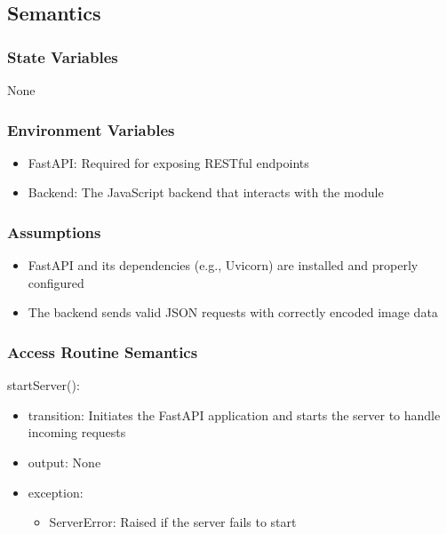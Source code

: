 \documentclass[12pt, titlepage]{article}
\begin{document}
\subsection{Semantics}

\subsubsection{State Variables}
None


\subsubsection{Environment Variables}
\begin{itemize}
  \item FastAPI: Required for exposing RESTful endpoints
  \item Backend: The JavaScript backend that interacts with the module
\end{itemize}

\subsubsection{Assumptions}
\begin{itemize}
  \item FastAPI and its dependencies (e.g., Uvicorn) are installed and properly configured
  \item The backend sends valid JSON requests with correctly encoded image data
\end{itemize}


\subsubsection{Access Routine Semantics}

\noindent startServer():
\begin{itemize}
\item transition: Initiates the FastAPI application and starts the server to handle incoming requests
\item output: None
\item exception: 
\begin{itemize}
  \item ServerError: Raised if the server fails to start
\end{itemize}

\end{itemize}
\end{document}
